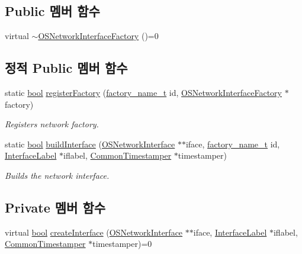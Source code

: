 \subsection*{Public 멤버 함수}
\begin{DoxyCompactItemize}
\item 
virtual \hyperlink{class_o_s_network_interface_factory_a15743563f2d48f36363f51b5e2be90c0}{$\sim$\+O\+S\+Network\+Interface\+Factory} ()=0
\end{DoxyCompactItemize}
\subsection*{정적 Public 멤버 함수}
\begin{DoxyCompactItemize}
\item 
static \hyperlink{avb__gptp_8h_af6a258d8f3ee5206d682d799316314b1}{bool} \hyperlink{class_o_s_network_interface_factory_a31c35b66fcf0061135c152be8e602acd}{register\+Factory} (\hyperlink{classfactory__name__t}{factory\+\_\+name\+\_\+t} id, \hyperlink{class_o_s_network_interface_factory}{O\+S\+Network\+Interface\+Factory} $\ast$factory)
\begin{DoxyCompactList}\small\item\em Registers network factory. \end{DoxyCompactList}\item 
static \hyperlink{avb__gptp_8h_af6a258d8f3ee5206d682d799316314b1}{bool} \hyperlink{class_o_s_network_interface_factory_a459ade6d7c1a3b8688bb8f982805077d}{build\+Interface} (\hyperlink{class_o_s_network_interface}{O\+S\+Network\+Interface} $\ast$$\ast$iface, \hyperlink{classfactory__name__t}{factory\+\_\+name\+\_\+t} id, \hyperlink{class_interface_label}{Interface\+Label} $\ast$iflabel, \hyperlink{class_common_timestamper}{Common\+Timestamper} $\ast$timestamper)
\begin{DoxyCompactList}\small\item\em Builds the network interface. \end{DoxyCompactList}\end{DoxyCompactItemize}
\subsection*{Private 멤버 함수}
\begin{DoxyCompactItemize}
\item 
virtual \hyperlink{avb__gptp_8h_af6a258d8f3ee5206d682d799316314b1}{bool} \hyperlink{class_o_s_network_interface_factory_a13f4010bc12d8b5d7cbaf71d4328b8df}{create\+Interface} (\hyperlink{class_o_s_network_interface}{O\+S\+Network\+Interface} $\ast$$\ast$iface, \hyperlink{class_interface_label}{Interface\+Label} $\ast$iflabel, \hyperlink{class_common_timestamper}{Common\+Timestamper} $\ast$timestamper)=0
\end{DoxyCompactItemize}
